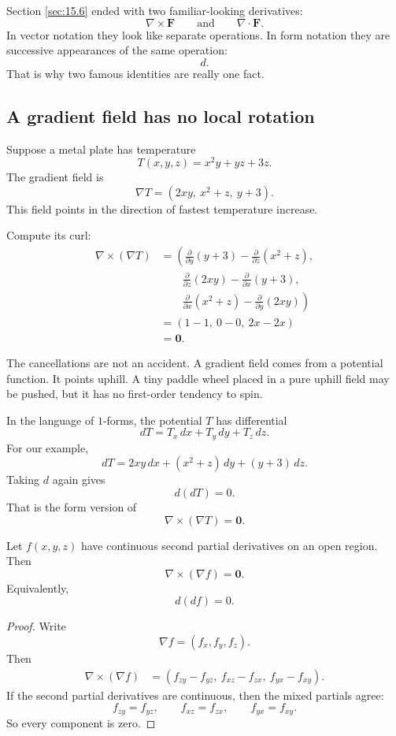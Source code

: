 Section \ref{sec:15.6} ended with two familiar-looking derivatives:
\[
    \nabla\times \mathbf F
    \qquad\text{and}\qquad
    \nabla\cdot \mathbf F.
\]
In vector notation they look like separate operations.  In form notation they are
successive appearances of the same operation:
\[
    d.
\]
That is why two famous identities are really one fact.

\subsection{A gradient field has no local rotation}

Suppose a metal plate has temperature
\[
    T(x,y,z)=x^2y+yz+3z.
\]
The gradient field is
\[
    \nabla T=(2xy,\ x^2+z,\ y+3).
\]
This field points in the direction of fastest temperature increase.

Compute its curl:
\[
\begin{aligned}
\nabla\times(\nabla T)
&=
\left(
\frac{\partial}{\partial y}(y+3)
-
\frac{\partial}{\partial z}(x^2+z),
\right.\\
&\qquad
\frac{\partial}{\partial z}(2xy)
-
\frac{\partial}{\partial x}(y+3),
\\
&\qquad\left.
\frac{\partial}{\partial x}(x^2+z)
-
\frac{\partial}{\partial y}(2xy)
\right)\\[1mm]
&=
(1-1,\ 0-0,\ 2x-2x)\\
&=
\mathbf 0.
\end{aligned}
\]

The cancellations are not an accident.  A gradient field comes from a potential
function.  It points uphill.  A tiny paddle wheel placed in a pure uphill field may be
pushed, but it has no first-order tendency to spin.

In the language of \(1\)-forms, the potential \(T\) has differential
\[
    dT=T_x\,dx+T_y\,dy+T_z\,dz.
\]
For our example,
\[
    dT=2xy\,dx+(x^2+z)\,dy+(y+3)\,dz.
\]
Taking \(d\) again gives
\[
    d(dT)=0.
\]
That is the form version of
\[
    \nabla\times(\nabla T)=\mathbf 0.
\]

\begin{theorem}
Let \(f(x,y,z)\) have continuous second partial derivatives on an open region.  Then
\[
\boxed{
    \nabla\times(\nabla f)=\mathbf 0.
}
\]
Equivalently,
\[
\boxed{
    d(df)=0.
}
\]
\end{theorem}

\begin{proof}
Write
\[
    \nabla f=(f_x,f_y,f_z).
\]
Then
\[
\begin{aligned}
\nabla\times(\nabla f)
&=
(f_{zy}-f_{yz},\ f_{xz}-f_{zx},\ f_{yx}-f_{xy}).
\end{aligned}
\]
If the second partial derivatives are continuous, then the mixed partials agree:
\[
    f_{zy}=f_{yz},\qquad
    f_{xz}=f_{zx},\qquad
    f_{yx}=f_{xy}.
\]
So every component is zero.
\end{proof}

